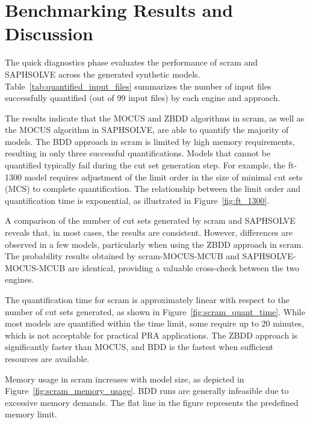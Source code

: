 \section{Benchmarking Results and Discussion}
The quick diagnostics phase evaluates the performance of scram and SAPHSOLVE across the generated synthetic models. Table~\ref{tab:quantified_input_files} summarizes the number of input files successfully quantified (out of 99 input files) by each engine and approach.



The results indicate that the MOCUS and ZBDD algorithms in scram, as well as the MOCUS algorithm in SAPHSOLVE, are able to quantify the majority of models. The BDD approach in scram is limited by high memory requirements, resulting in only three successful quantifications. Models that cannot be quantified typically fail during the cut set generation step. For example, the ft-1300 model requires adjustment of the limit order in the size of minimal cut sets (MCS) to complete quantification. The relationship between the limit order and quantification time is exponential, as illustrated in Figure~\ref{fig:ft_1300}.



A comparison of the number of cut sets generated by scram and SAPHSOLVE reveals that, in most cases, the results are consistent. However, differences are observed in a few models, particularly when using the ZBDD approach in scram. The probability results obtained by scram-MOCUS-MCUB and SAPHSOLVE-MOCUS-MCUB are identical, providing a valuable cross-check between the two engines.

The quantification time for scram is approximately linear with respect to the number of cut sets generated, as shown in Figure~\ref{fig:scram_quant_time}. While most models are quantified within the time limit, some require up to 20 minutes, which is not acceptable for practical PRA applications. The ZBDD approach is significantly faster than MOCUS, and BDD is the fastest when sufficient resources are available.



Memory usage in scram increases with model size, as depicted in Figure~\ref{fig:scram_memory_usage}. BDD runs are generally infeasible due to excessive memory demands. The flat line in the figure represents the predefined memory limit.

